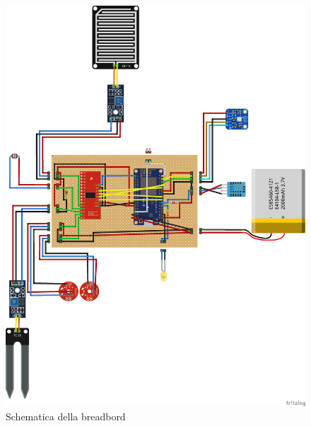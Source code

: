 \documentclass[a4paper, 12pt]{report}
\begin{document}
\begin{figure}[htbp]
\centering
\includegraphics[scale=0.3]{hardware/iot_project_bb.png}
\caption{Schematica della breadbord}
\label{fig:breadboard}
\end{figure}
\end{document}
